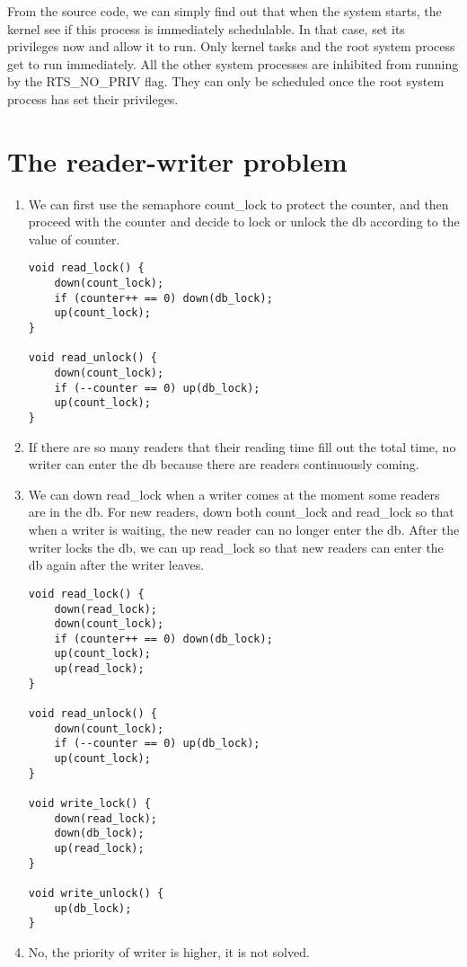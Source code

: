 \documentclass{article}
\begin{document}
\inputminted{c}{ex5.c}

From the source code, we can simply find out that when the system starts, the kernel see if this process is immediately schedulable. In that case, set its privileges now and allow it to run. Only kernel tasks and the root system process get to run immediately. All the other system processes are inhibited from running by the RTS\_NO\_PRIV flag. They can only be scheduled once the root system process has set their privileges.

\section{The reader-writer problem}
\begin{enumerate}
\item
We can first use the semaphore count\_lock to protect the counter, and then proceed with the counter and decide to lock or unlock the db according to the value of counter.
\begin{verbatim}
void read_lock() {
    down(count_lock);
    if (counter++ == 0) down(db_lock);
    up(count_lock);
}

void read_unlock() {
    down(count_lock);
    if (--counter == 0) up(db_lock);
    up(count_lock);
}
\end{verbatim}
\item
If there are so many readers that their reading time fill out the total time, no writer can enter the db because there are readers continuously coming.
\item
We can down read\_lock when a writer comes at the moment some readers are in the db. For new readers, down both count\_lock and read\_lock so that when a writer is waiting, the new reader can no longer enter the db. After the writer locks the db, we can up read\_lock so that new readers can enter the db again after the writer leaves.
\begin{verbatim}
void read_lock() {
    down(read_lock);
    down(count_lock);
    if (counter++ == 0) down(db_lock);
    up(count_lock);
    up(read_lock);
}

void read_unlock() {
    down(count_lock);
    if (--counter == 0) up(db_lock);
    up(count_lock);
}

void write_lock() {
    down(read_lock);
    down(db_lock);
    up(read_lock);
}

void write_unlock() {
    up(db_lock);
}
\end{verbatim}
\item
No, the priority of writer is higher, it is not solved.
\end{enumerate}
\end{document}
